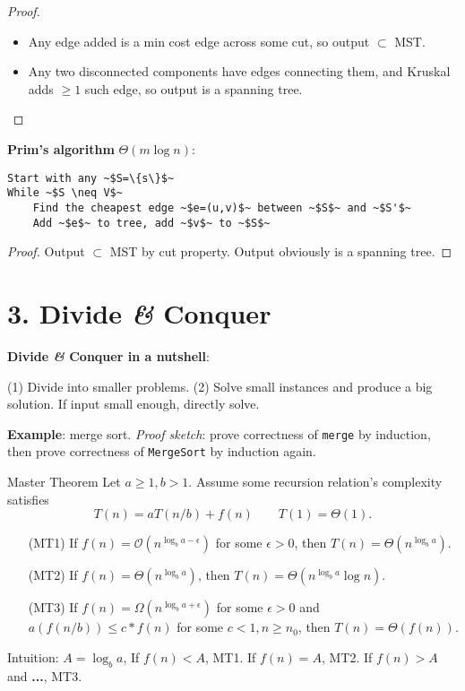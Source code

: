 \documentclass{memoir}
\begin{document}
\begin{multicols*}{3}
\begin{proof}{}{}
		\begin{itemize}
				\item Any edge added is a min cost edge across some cut, so output $\subset $ MST.
				\item Any two disconnected components have edges connecting them, and Kruskal adds $\geqslant 1$ such edge, so output is a spanning tree. \qedhere
		\end{itemize}
\end{proof}

\textbf{Prim's algorithm} $\Theta(m\log n)$:
\begin{lstlisting}[basicstyle=\fontsize{7}{8}\selectfont\ttfamily]
Start with any ~$S=\{s\}$~
While ~$S \neq V$~
	Find the cheapest edge ~$e=(u,v)$~ between ~$S$~ and ~$S'$~
	Add ~$e$~ to tree, add ~$v$~ to ~$S$~
\end{lstlisting}
\begin{proof}{}{}
		Output $\subset $ MST by cut property. Output obviously is a spanning tree.
\end{proof}

\section*{3. Divide \textit{\&} Conquer}

\textbf{Divide \textit{\&} Conquer in a nutshell}:

		(1) Divide into smaller problems. (2) Solve small instances and produce a big solution. If input small enough, directly solve.
  
  \textbf{Example}: merge sort. \textit{Proof sketch}: prove correctness of \texttt{merge} by induction, then prove correctness of \texttt{MergeSort} by induction again.


\begin{theorem*}{Master Theorem}{}
		Let $a\geqslant 1, b>1$. Assume some recursion relation's complexity satisfies
		\[
				T(n) = a T(n /b) + f(n)\qquad T(1) = \Theta (1).
		\] 
		\begin{itemize}
				\item[(MT1)] If $f(n) = \mathcal{O}(n ^{ \log _b a-\epsilon})$ for some $\epsilon>0$, then $\boxed{T(n) = \Theta (n^{\log _ba})}$.
				\item[(MT2)] If $f(n) = \Theta  (n^{\log _b a})$, then $\boxed{T(n) = \Theta  (n^{\log _b a} \log n)}$.
				\item[(MT3)] If $f(n) = \Omega(n^{\log _b a+\epsilon})$ for some $\epsilon>0$ and $a(f(n/b))\leq c*f(n)$ for some $c<1, n\geq n_0$, then $\boxed{T(n) = \Theta (f(n))}$.
		\end{itemize}
\end{theorem*}
Intuition: $A=\log_ba$, If $f(n) < A$, MT1. If $f(n)=A$, MT2. If $f(n)>A$ and \textbf{...}, MT3.


\end{multicols*}
\end{document}
